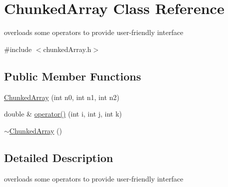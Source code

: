 \hypertarget{classChunkedArray}{\section{Chunked\-Array Class Reference}
\label{classChunkedArray}
}


overloads some operators to provide user-\/friendly interface  




{\ttfamily \#include $<$chunked\-Array.\-h$>$}

\subsection*{Public Member Functions}
\begin{DoxyCompactItemize}
\item 
\hyperlink{classChunkedArray_a559ee7134909f24e0e77f05ed7905309}{Chunked\-Array} (int n0, int n1, int n2)
\item 
double \& \hyperlink{classChunkedArray_a2b34add05354d1cd850bd4dc43021c65}{operator()} (int i, int j, int k)
\item 
\hyperlink{classChunkedArray_a71913a12bb4934f6e01a594ff1e429fa}{$\sim$\-Chunked\-Array} ()
\end{DoxyCompactItemize}


\subsection{Detailed Description}
overloads some operators to provide user-\/friendly interface 

